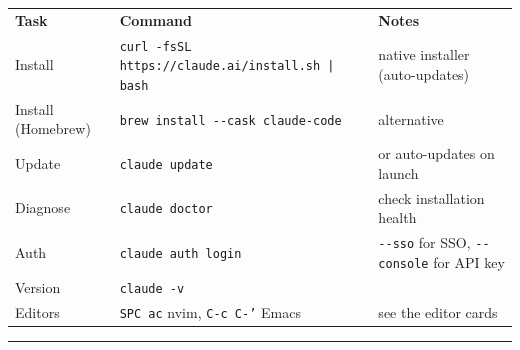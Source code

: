 \documentclass[10pt]{extarticle}
\begin{document}
\small


\begin{tabularx}{\linewidth}{@{}l@{\quad}l@{\quad}Y@{}}
\textbf{Task}        & \textbf{Command}                                  & \textbf{Notes} \\[2pt]
Install              & \texttt{curl -fsSL https://claude.ai/install.sh | bash}  & native installer (auto-updates) \\
Install (Homebrew)   & \texttt{brew install -{}-cask claude-code}        & alternative \\
Update               & \texttt{claude update}                            & or auto-updates on launch \\
Diagnose             & \texttt{claude doctor}                            & check installation health \\
Auth                 & \texttt{claude auth login}                        & \texttt{-{}-sso} for SSO, \texttt{-{}-console} for API key \\
Version              & \texttt{claude -v}                                & \\
Editors              & \texttt{SPC ac} nvim, \texttt{C-c C-'} Emacs       & see the editor cards \\
\end{tabularx}

\vspace{6pt}
\rule{\linewidth}{0.2pt}
\end{document}
